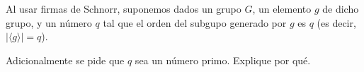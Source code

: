 %

Al usar firmas de Schnorr, suponemos dados un grupo $G$, un elemento $g$ de dicho grupo, y un número $q$ tal que el orden del subgupo generado por $g$ es $q$ (es decir, $|\langle g\rangle|=q$).

Adicionalmente se pide que $q$ sea un número primo. Explique por qué.

